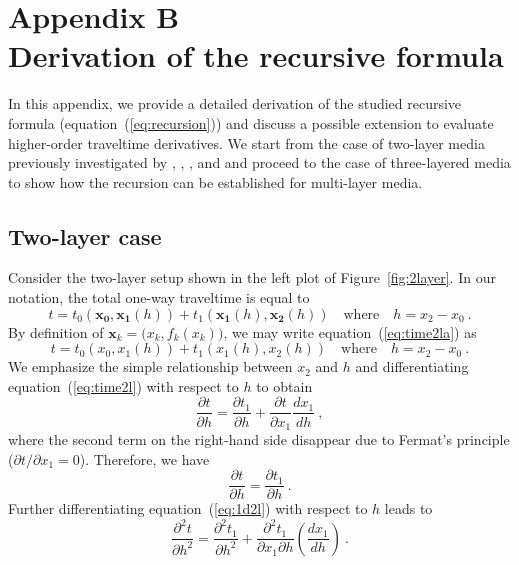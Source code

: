 \section{Appendix B \\ Derivation of the recursive formula}
In this appendix, we provide a detailed derivation of the studied recursive formula (equation~(\ref{eq:recursion})) and discuss a possible extension to evaluate higher-order traveltime derivatives. We start from the case of two-layer media previously investigated by \cite{blias1981}, \cite{bliasgrit1984},  \cite{gritsenko}, and \cite{goldin} and proceed to the case of three-layered media to show how the recursion can be established for multi-layer media.


\subsection{Two-layer case}
Consider the two-layer setup shown in the left plot of Figure~\ref{fig:2layer}. In our notation, the total one-way traveltime is equal to
\begin{equation}
\label{eq:time2la}
t = t_0(\mathbf{x_0},\mathbf{x_1}(h)) + t_1(\mathbf{x_1}(h),\mathbf{x_2}(h)) \quad\text{where}\quad h = x_2-x_0~.
\end{equation}
By definition of $\mathbf{x}_k= \big(x_k,f_k(x_k)\big)$, we may write equation~(\ref{eq:time2la}) as
\begin{equation}
\label{eq:time2l}
t = t_0(x_0,x_1(h)) + t_1(x_1(h),x_2(h)) \quad\text{where}\quad h = x_2-x_0~.
\end{equation}
We emphasize the simple relationship between $x_2$ and $h$ and differentiating equation~(\ref{eq:time2l}) with respect to $h$ to obtain  
\begin{equation}
\frac{\partial t}{\partial h} = \frac{\partial t_1}{\partial h} +  \frac{\partial t}{\partial x_1}  \frac{d x_1}{d h}  ~,
\end{equation}
where the second term on the right-hand side disappear due to Fermat's principle ($\partial t / \partial x_1 = 0$). Therefore, we have 
\begin{equation}
\label{eq:1d2l}
\frac{\partial t}{\partial h} = \frac{\partial t_1}{\partial h}  ~.
\end{equation}
Further differentiating equation~(\ref{eq:1d2l}) with respect to $h$ leads to
\begin{equation}
\label{eq:2d2l}
\frac{\partial^2 t}{\partial h^2} = \frac{\partial^2 t_1}{\partial h^2} + \frac{\partial^2 t_1}{\partial x_1 \partial h}\left( \frac{d x_1}{d h}\right) ~.
\end{equation}
